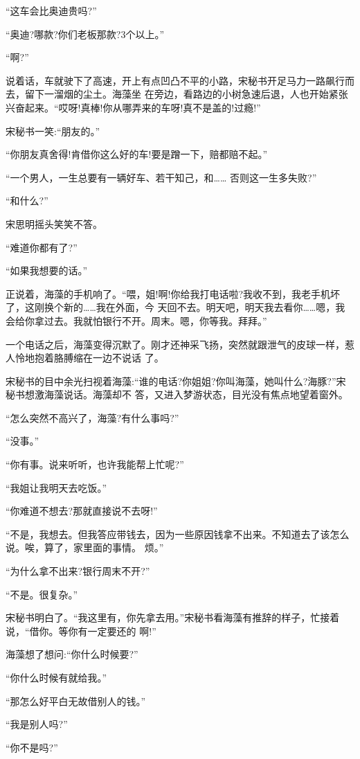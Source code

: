 \documentclass[11pt,a4paper,onecolumn]{article}
\begin{document}
``这车会比奥迪贵吗?''

``奥迪?哪款?你们老板那款?3个以上。''

``啊?''

说着话，车就驶下了高速，开上有点凹凸不平的小路，宋秘书开足马力一路飙行而去，留下一溜烟的尘土。海藻坐
在旁边，看路边的小树急速后退，人也开始紧张兴奋起来。``哎呀!真棒!你从哪弄来的车呀!真不是盖的!过瘾!''

宋秘书一笑:``朋友的。''

``你朋友真舍得!肯借你这么好的车!要是蹭一下，赔都赔不起。''

``一个男人，一生总要有一辆好车、若干知己，和…… 否则这一生多失败?''

``和什么?''

宋思明摇头笑笑不答。

``难道你都有了?''

``如果我想要的话。''

正说着，海藻的手机响了。``喂，姐!啊!你给我打电话啦?我收不到，我老手机坏了，这刚换个新的……我在外面，今
天回不去。明天吧，明天我去看你……嗯，我会给你拿过去。我就怕银行不开。周末。嗯，你等我。拜拜。''

一个电话之后，海藻变得沉默了。刚才还神采飞扬，突然就跟泄气的皮球一样，惹人怜地抱着胳膊缩在一边不说话
了。

宋秘书的目中余光扫视着海藻:``谁的电话?你姐姐?你叫海藻，她叫什么?海豚?''宋秘书想激海藻说话。海藻却不
答，又进入梦游状态，目光没有焦点地望着窗外。

``怎么突然不高兴了，海藻?有什么事吗?''

``没事。''

``你有事。说来听听，也许我能帮上忙呢?''

``我姐让我明天去吃饭。''

``你难道不想去?那就直接说不去呀!''

``不是，我想去。但我答应带钱去，因为一些原因钱拿不出来。不知道去了该怎么说。唉，算了，家里面的事情。
烦。''

``为什么拿不出来?银行周末不开?''

``不是。很复杂。''

宋秘书明白了。``我这里有，你先拿去用。''宋秘书看海藻有推辞的样子，忙接着说，``借你。等你有一定要还的
啊!''

海藻想了想问:``你什么时候要?''

``你什么时候有就给我。''

``那怎么好平白无故借别人的钱。''

``我是别人吗?''

``你不是吗?''
\end{document}
